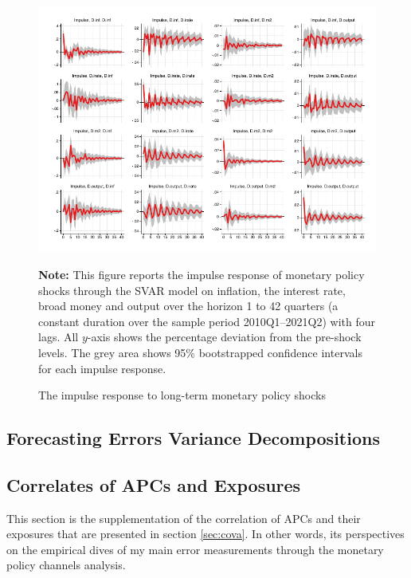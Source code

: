 \documentclass[11pt,letterpaper]{article}
\begin{document}
\begin{figure}[H]
	\centering
	\caption{The impulse response to long-term monetary policy shocks}
	\label{fig:lsvar2}
	\includegraphics[width=1\linewidth]{../../empirical/Marcodata/Graphs/impulse_svar2}
	\begin{tablenotes}
		\footnotesize
		\item \textbf{Note:} This figure reports the impulse response of monetary policy shocks through the SVAR model on inflation, the interest rate, broad money and output over the horizon 1 to 42 quarters (a constant duration over the sample period 2010Q1–2021Q2) with four lags. All $y$-axis shows the percentage deviation from the pre-shock levels. The grey area shows 95\% bootstrapped confidence intervals for each impulse response.
		
	\end{tablenotes} 
\end{figure}


	\subsection{Forecasting Errors Variance Decompositions }
	
	
	


	\subsection{Correlates of APCs and Exposures}
	This section is the supplementation of the correlation of APCs and their exposures that are presented in section \ref{sec:cova}. In other words, its perspectives on the empirical dives of my main error measurements through the monetary policy channels analysis.  
	
\end{document}

